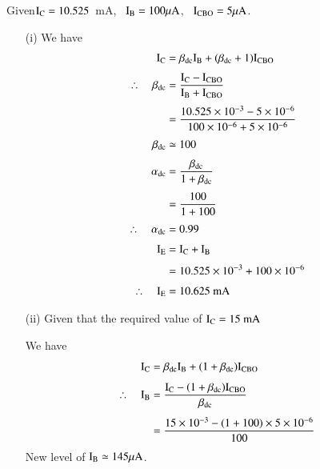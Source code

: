 \begin{solution}
Given\quad $\textrm{I}_{\textrm{C}}=10.525$~mA, \ $\textrm{I}_{\textrm{B}}=100\mu\textrm{A}$, \ $\textrm{I}_{\text{CBO}}=5\mu\textrm{A}$.
\begin{itemize}
\item[(i)] We have
\begin{align*}
\textrm{I}_{\textrm{C}} &= \beta_{\text{dc}}\textrm{I}_{\textrm{B}}+(\beta_{\text{dc}}+1)\textrm{I}_{\text{CBO}}\\[3pt]
\therefore\quad \beta_{\text{dc}} &= \frac{\textrm{I}_{\textrm{C}}-\textrm{I}_{\text{CBO}}}{\textrm{I}_{\textrm{B}}+\textrm{I}_{\text{CBO}}}\\[3pt]
&= \frac{10.525\times 10^{-3}-5\times 10^{-6}}{100\times 10^{-6}+5\times 10^{-6}}\\[3pt]
\beta_{\text{dc}} &\simeq 100\\[3pt]
\alpha_{\text{dc}} &= \frac{\beta_{\text{dc}}}{1+\beta_{\text{dc}}}\\[3pt]
&= \frac{100}{1+100}\\[3pt]
\therefore\quad \alpha_{\text{dc}} &= 0.99\\[3pt]
\textrm{I}_{\textrm{E}} &= \textrm{I}_{\textrm{C}}+\textrm{I}_{\textrm{B}}\\[3pt]
&= 10.525\times 10^{-3}+100\times 10^{-6}\\[3pt]
\therefore\quad \textrm{I}_{\textrm{E}} &= 10.625\text{~mA}
\end{align*}

\item[(ii)] Given that the required value of $\textrm{I}_{\textrm{C}}=15\text{~mA}$

We have 
\begin{align*}
\textrm{I}_{\textrm{C}} &= \beta_{\text{dc}}\textrm{I}_{\textrm{B}}+(1+\beta_{\text{dc}})\textrm{I}_{\text{CBO}}\\[4pt]
\therefore\quad \textrm{I}_{\textrm{B}} &= \frac{\textrm{I}_{\textrm{C}}-(1+\beta_{\text{dc}})\textrm{I}_{\text{CBO}}}{\beta_{\text{dc}}}\\[4pt]
&= \frac{15\times 10^{-3}-(1+100)\times 5\times 10^{-6}}{100}
\end{align*}
New level of $\textrm{I}_{\textrm{B}}\simeq 145\mu\textrm{A}$.
\end{itemize}
\end{solution}

